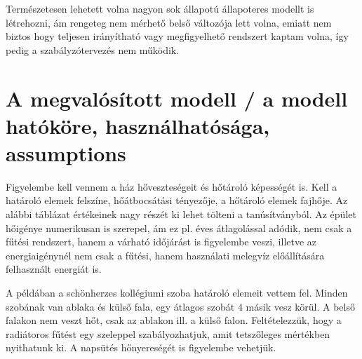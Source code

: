 Természetesen lehetett volna nagyon sok állapotú állapoteres modellt is létrehozni, ám rengeteg nem mérhető belső változója lett volna, emiatt nem biztos hogy teljesen irányítható vagy megfigyelhető rendszert kaptam volna, így pedig a szabályzótervezés nem működik.





\section{A megvalósított modell / a modell hatóköre, használhatósága, assumptions}

Figyelembe kell vennem a ház hőveszteségeit és hőtároló képességét is.
Kell a határoló elemek felszíne, hőátbocsátási tényezője, a hőtároló elemek fajhője. Az alábbi táblázat értékeinek nagy részét ki lehet tölteni a tanúsítványból.
Az épület hőigénye numerikusan is szerepel, ám ez pl. éves átlagolással adódik, nem csak a fűtési rendszert, hanem a várható időjárást is figyelembe veszi, illetve az energiaigénynél nem csak a fűtési, hanem használati melegvíz előállítására felhasznált energiát is.


\begin{table}[H]
	\centering
	
	\renewcommand{\arraystretch}{2} %
	
	
	
	
	\caption{Egy szoba határoló felületei és azok termikus tulajdonságai}
	\label{table_house_parameters}
\end{table}

 A példában a schönherzes kollégiumi szoba határoló elemeit vettem fel. Minden szobának van ablaka és külső fala, egy átlagos szobát 4 másik vesz körül. A belső falakon nem veszt hőt, csak az ablakon ill. a külső falon. Feltételezzük, hogy a radiátoros fűtést egy szeleppel szabályozhatjuk, amit tetszőleges mértékben nyithatunk ki.
 A napsütés hőnyereségét is figyelembe vehetjük.%

